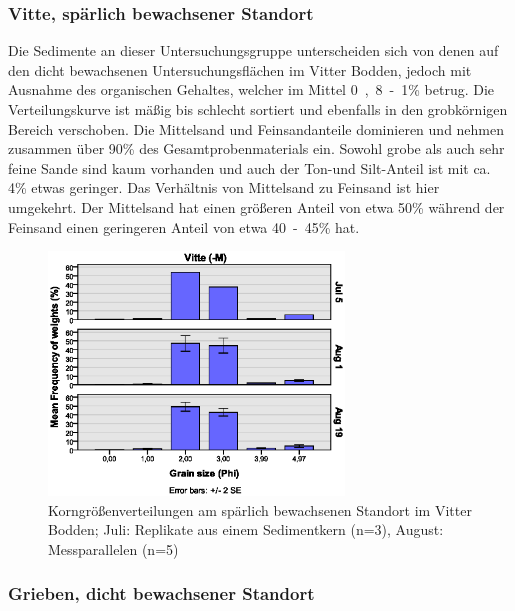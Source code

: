 \subsubsection{Vitte, spärlich bewachsener Standort}

Die Sedimente an dieser Untersuchungsgruppe unterscheiden sich von denen auf den dicht bewachsenen Untersuchungsflächen im Vitter Bodden, jedoch mit Ausnahme des organischen Gehaltes, welcher im Mittel \unit{0,8-1}{\%} betrug. Die Verteilungskurve ist mäßig bis schlecht sortiert und ebenfalls in den grobkörnigen Bereich verschoben. Die Mittelsand und Feinsandanteile dominieren und nehmen zusammen über \unit{90}{\%} des Gesamtprobenmaterials ein. Sowohl grobe als auch sehr feine Sande sind kaum vorhanden und auch der Ton-und Silt-Anteil ist mit ca. \unit{4}{\%} etwas geringer. Das Verhältnis von Mittelsand zu Feinsand ist hier umgekehrt. Der Mittelsand hat einen größeren Anteil von etwa \unit{50}{\%} während der Feinsand einen geringeren Anteil von etwa \unit{40-45}{\%} hat. 


\begin{figure}[!htb]
\centering
\includegraphics[width=0.70\textwidth]{images/grainsize/sediment_im_jahr2.eps}
\caption[Korngrößenverteilungen Vitte (-M)]{Korngrößenverteilungen am spärlich bewachsenen Standort im Vitter Bodden; Juli: Replikate aus einem Sedimentkern (n=3), August: Messparallelen (n=5)}
\label{fig:korngrössen_Vitte_-m}
\end{figure}


\subsubsection{Grieben, dicht bewachsener Standort}

